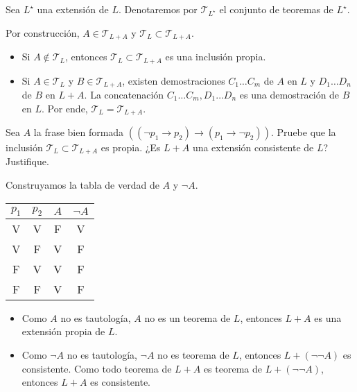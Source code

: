 \begin{notation}
Sea $L^\star$ una extensión de $L$. Denotaremos por $\mathscr T_{L^\star}$ el conjunto de teoremas de $L^\star$.
\end{notation}

\begin{solution}
Por construcción, $A \in \mathscr T_{L+A}$ y $\mathscr T_L \subset \mathscr T_{L+A}$.
\begin{itemize}
    \item Si $A \not \in \mathscr T_L$, entonces $\mathscr T_L \subset \mathscr T_{L+A}$ es una inclusión propia.
    \item Si $A \in \mathscr T_L$ y $B \in \mathscr T_{L+A}$, existen demostraciones $C_1 \dots C_m$ de $A$ en $L$ y $D_1 \dots D_n$ de $B$ en $L+A$. La concatenación $C_1 \dots C_m, D_1 \dots D_n$ es una demostración de $B$ en $L$. Por ende, $\mathscr T_L = \mathscr T_{L+A}$.
\end{itemize}
\end{solution}

\begin{exercise}
Sea $A$ la frase bien formada $((\neg p_1 \to p_2) \to (p_1 \to \neg p_2))$. Pruebe que la inclusión $\mathscr T_L \subset \mathscr T_{L+A}$ es propia. ¿Es $L+A$ una extensión consistente de $L$? Justifique.
\end{exercise}

\begin{solution}
Construyamos la tabla de verdad de $A$ y $\neg A$.

\begin{center}
\begin{tabular}{cc|c|c}
    $p_1$ & $p_2$ & $A$ & $\neg A$ \\
    \hline
    V & V & F & V \\
    V & F & V & F \\
    F & V & V & F \\
    F & F & V & F \\
\end{tabular}
\end{center}

\begin{itemize}
    \item Como $A$ no es tautología, $A$ no es un teorema de $L$, entonces $L+A$ es una extensión propia de $L$.
    \item Como $\neg A$ no es tautología, $\neg A$ no es teorema de $L$, entonces $L + (\neg \neg A)$ es consistente. Como todo teorema de $L+A$ es teorema de $L + (\neg \neg A)$, entonces $L+A$ es consistente.
\end{itemize}
\end{solution}

